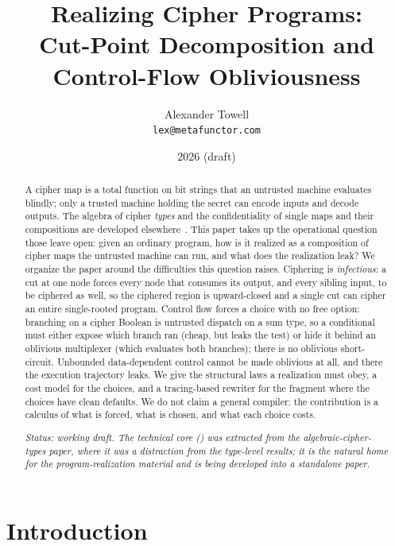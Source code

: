 \documentclass[11pt]{article}
\title{Realizing Cipher Programs:\\Cut-Point Decomposition and Control-Flow Obliviousness}
\author{Alexander Towell\\\texttt{lex@metafunctor.com}}
\date{2026 (draft)}
\theoremstyle{definition}
\theoremstyle{plain}
\theoremstyle{remark}
\begin{document}
\maketitle

\begin{abstract}
A cipher map is a total function on bit strings that an untrusted
machine evaluates blindly; only a trusted machine holding the secret
can encode inputs and decode outputs.
The algebra of cipher \emph{types} and the confidentiality of single
maps and their compositions are developed
elsewhere~\cite{towell2026algebraic,towell2026cipher}.
This paper takes up the operational question those leave open: given an
ordinary program, how is it realized as a composition of cipher maps
the untrusted machine can run, and what does the realization leak?
We organize the paper around the difficulties this question raises.
Ciphering is \emph{infectious}: a cut at one node forces every node
that consumes its output, and every sibling input, to be ciphered as
well, so the ciphered region is upward-closed and a single cut can
cipher an entire single-rooted program.
Control flow forces a choice with no free option: branching on a cipher
Boolean is untrusted dispatch on a sum type, so a conditional must
either expose which branch ran (cheap, but leaks the test) or hide it
behind an oblivious multiplexer (which evaluates both branches); there
is no oblivious short-circuit.
Unbounded data-dependent control cannot be made oblivious at all, and
there the execution trajectory leaks.
We give the structural laws a realization must obey, a cost model for
the choices, and a tracing-based rewriter for the fragment where the
choices have clean defaults.
We do not claim a general compiler: the contribution is a calculus of
what is forced, what is chosen, and what each choice costs.

\medskip
\noindent\emph{Status: working draft. The technical core
() was extracted from the algebraic-cipher-types
paper, where it was a distraction from the type-level results; it is
the natural home for the program-realization material and is being
developed into a standalone paper.}
\end{abstract}


\section{Introduction}
\label{sec:intro}
\end{document}
